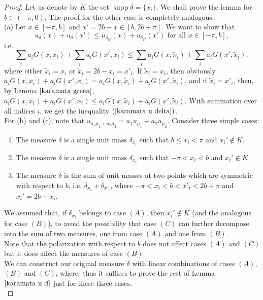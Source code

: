 \documentclass[11pt]{amsart}
\numberwithin{equation}{section}
\begin{document}
\begin{proof}
Let us denote by \(K\) the set \(\operatorname{supp}\delta=\{x_i\}\). We shall prove the lemma for \(b\in(-\pi,0).\) The proof for the other case is completely analogous.\\
(a) Let \(x\in[-\pi,b]\) and \(x'=2b-x\in[b,2b+\pi].\) We want to show that
\begin{equation}\label{karamata u delta}
u_\delta(x)+u_\delta(x')\leq u_{\delta_H}(x)+u_{\delta_H}(x') \text{ for all }x\in[-\pi,b],
\end{equation}
i.e.
\[\sum_i a_i G(x,x_i)+\sum_i a_i G(x',x_i)\leq\sum_i a_iG(x,\tilde{x}_i)+\sum_i a_iG(x',\tilde{x}_i),\]
where either \(\tilde{x}_i=x_i\) or \(\tilde{x}_i=2b-x_i=x'_i.\) If \(\tilde{x}_i=x_i\), then obviously \(a_iG(x,x_i)+a_iG(x',x_i)=a_iG(x,\tilde{x}_i)+a_iG(x',\tilde{x}_i)\), and if \(\tilde{x}_i=x'_i\), then, by Lemma \(\ref{karamata green}\), \(a_iG(x,x_i)+a_iG(x',x_i)\leq a_iG(x,\tilde{x}_i)+a_iG(x',\tilde{x}_i)\). With summation over all indices \(i\), we get the inequality \((\ref{karamata u delta})\).\\
For (b) and (c), note that \(u_{a_1\mu_1+a_2\mu_2}=a_1u_{\mu_1}+a_2u_{\mu_2}\). Consider three simple cases:
\begin{enumerate}
    \item[(A)] The measure \(\delta\) is a single unit mass \(\delta_{x_i}\) such that \(b\leq x_i<\pi\) and \(x_i'\notin K\).
    \item[(B)] The measure \(\delta\) is a single unit mass \(\delta_{x_i}\) such that \(-\pi<x_i<b\) and \(x_i'\notin K\).
    \item[(C)] The measure \(\delta\) is the sum of unit masses at two points which are symmetric with respect to \(b\), i.e. \(\delta_{x_i}+\delta_{x'_i}\), where \(-\pi<x_i<b<x'_i<2b+\pi\) and \(x_i'=2b-x_i\).
\end{enumerate}
We assumed that, if \(\delta_{x_i}\) belongs to case \((A)\), then \(x_i'\notin K\) (and the analogous for case \((B)\)), to avoid the possibility that case \((C)\) can further decompose into the sum of two measures, one from case \((A)\) and one from \((B)\).\\
Note that the polarization with respect to \(b\) does not affect cases \((A)\) and \((C)\) but it does affect the measures of case \((B)\)\\
We can construct our original measure \(\delta\) with linear combinations of cases \((A)\), \((B)\) and \((C)\), where \(\) thus it suffices to prove the rest of Lemma \(\ref{karamata u d}\) just for these three cases.\\

\end{proof}
\end{document}
